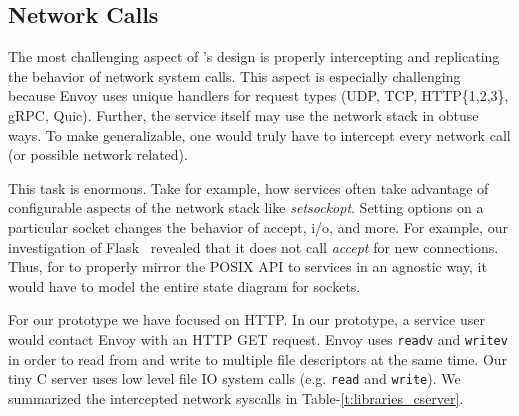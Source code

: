 \begin{table}[!ht]
    \begin{center}
        \caption{Libc Functions Preloaded (Tiny C Webserver)}
        \label{t:libraries_cserver}
    \end{center}
\end{table}

\subsection{\sysname Network Calls}
The most challenging aspect of \sysname's design is properly intercepting and replicating the behavior of network system calls.
This aspect is especially challenging because Envoy uses unique handlers for request types (UDP, TCP, HTTP\{1,2,3\}, gRPC, Quic).
Further, the service itself may use the network stack in obtuse ways.
To make \sysname generalizable, one would truly have to intercept every network call (or possible network related).

This task is enormous.
Take for example, how services often take advantage of configurable aspects of the network stack like \textit{setsockopt}.
Setting options on a particular socket changes the behavior of accept, i/o, and more.
For example, our investigation of Flask~\cite{flask} revealed that it does not call \textit{accept} for new connections.
Thus, for \sysname to properly mirror the POSIX API to services in an agnostic way, it would have to model the entire state diagram for sockets.

For our prototype we have focused on HTTP. In our prototype, a service user would contact Envoy with an HTTP GET request.
Envoy uses \texttt{readv} and \texttt{writev} in order to read from and write to multiple file descriptors at the same time.
Our tiny C server\cite{tiny} uses low level file IO system calls (e.g. \texttt{read} and \texttt{write}).
We summarized the intercepted network syscalls in Table-\ref{t:libraries_cserver}.


